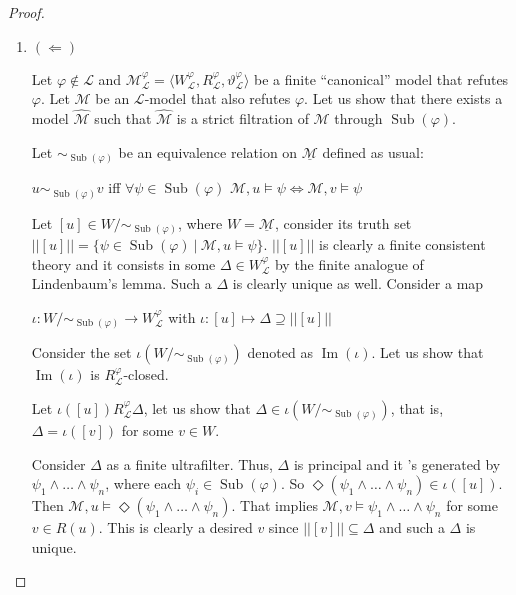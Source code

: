\documentclass[a4paper]{article}
\theoremstyle{defin}
\theoremstyle{theorem}
\theoremstyle{prop}
\theoremstyle{lemma}
\theoremstyle{fact}
\theoremstyle{ex}
\theoremstyle{col}
\begin{document}
\begin{proof}
\begin{enumerate}
    ...

    \item $(\Leftarrow)$

    Let $\varphi \not\in \mathcal{L}$ and $\mathcal{M}_{\mathcal{L}}^{\varphi} = \langle W_{\mathcal{L}}^{\varphi}, R_{\mathcal{L}}^{\varphi}, \vartheta_{\mathcal{L}}^{\varphi} \rangle$
    be a finite ``canonical'' model that refutes $\varphi$.
    Let $\mathcal{M}$ be an $\mathcal{L}$-model that also refutes $\varphi$.
    Let us show that there exists a model $\widehat{\mathcal{M}}$ such that
    $\widehat{\mathcal{M}}$ is a
    strict filtration of $\mathcal{M}$ through $\operatorname{Sub}(\varphi)$.

    Let $\sim_{\operatorname{Sub}(\varphi)}$ be an equivalence relation on $\underline{\mathcal{M}}$ defined as usual:

    \begin{center}
      $u \sim_{\operatorname{Sub}(\varphi)} v$ iff $\forall \psi \in \operatorname{Sub}(\varphi)$
      $\mathcal{M}, u \models \psi \Leftrightarrow \mathcal{M}, v \models \psi$
    \end{center}

    Let $[u] \in W/\sim_{\operatorname{Sub}(\varphi)}$, where $W = \underline{\mathcal{M}}$,
    consider its truth set $||[u]|| = \{ \psi \in \operatorname{Sub}(\varphi) \: | \: \mathcal{M}, u \models \psi \}$.
    $||[u]||$ is clearly a finite consistent theory and it consists in some $\Delta \in W_{\mathcal{L}}^{\varphi}$ by the finite analogue of Lindenbaum's lemma. Such a $\Delta$ is clearly unique as well.
    Consider a map
    \begin{center}
    $\iota : W/\sim_{\operatorname{Sub}(\varphi)} \to W_{\mathcal{L}}^{\varphi}$ with
    $\iota : [u] \mapsto \Delta \supseteq ||[u]||$
    \end{center}

    Consider the set $\iota(W/\sim_{\operatorname{Sub}(\varphi)})$ denoted as $\operatorname{Im}(\iota)$. Let us show that $\operatorname{Im}(\iota)$ is $R_{\mathcal{L}}^{\varphi}$-closed.

    Let $\iota([u]) R_{\mathcal{L}}^{\varphi} \Delta$, let us show that $\Delta \in \iota(W/\sim_{\operatorname{Sub}(\varphi)})$, that is, $\Delta = \iota([v])$ for some $v \in W$.

    Consider $\Delta$ as a finite ultrafilter. Thus, $\Delta$ is principal and it 's generated by $\psi_1 \land \dots \land \psi_n$, where each $\psi_i \in \operatorname{Sub}(\varphi)$. So $\Diamond (\psi_1 \land \dots \land \psi_n) \in \iota([u])$.
    Then $\mathcal{M}, u \models \Diamond (\psi_1 \land \dots \land \psi_n)$. That implies $\mathcal{M}, v \models \psi_1 \land \dots \land \psi_n$ for some $v \in R(u)$.
    This is clearly a desired $v$ since $||[v]|| \subseteq \Delta$ and such a $\Delta$ is unique.


\end{enumerate}
\end{proof}
\end{document}
